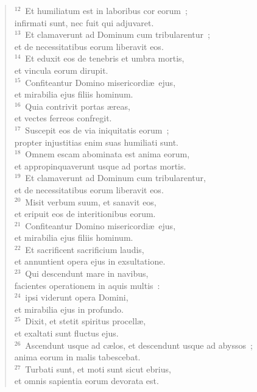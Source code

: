 \begin{verse}
${}^{12}$~Et humiliatum est in laboribus cor eorum~;\\ infirmati sunt, nec fuit qui adjuvaret.\\
${}^{13}$~Et clamaverunt ad Dominum cum tribularentur~;\\ et de necessitatibus eorum liberavit eos.\\
${}^{14}$~Et eduxit eos de tenebris et umbra mortis,\\ et vincula eorum dirupit.\\
${}^{15}$~Confiteantur Domino misericordi\ae\ ejus,\\ et mirabilia ejus filiis hominum.\\
${}^{16}$~Quia contrivit portas \ae reas,\\ et vectes ferreos confregit.\\
${}^{17}$~Suscepit eos de via iniquitatis eorum~;\\ propter injustitias enim suas humiliati sunt.\\
${}^{18}$~Omnem escam abominata est anima eorum,\\ et appropinquaverunt usque ad portas mortis.\\
${}^{19}$~Et clamaverunt ad Dominum cum tribularentur,\\ et de necessitatibus eorum liberavit eos.\\
${}^{20}$~Misit verbum suum, et sanavit eos,\\ et eripuit eos de interitionibus eorum.\\
${}^{21}$~Confiteantur Domino misericordi\ae\ ejus,\\ et mirabilia ejus filiis hominum.\\
${}^{22}$~Et sacrificent sacrificium laudis,\\ et annuntient opera ejus in exsultatione.\\
${}^{23}$~Qui descendunt mare in navibus,\\ facientes operationem in aquis multis~:\\
${}^{24}$~ipsi viderunt opera Domini,\\ et mirabilia ejus in profundo.\\
${}^{25}$~Dixit, et stetit spiritus procell\ae ,\\ et exaltati sunt fluctus ejus.\\
${}^{26}$~Ascendunt usque ad c\ae los, et descendunt usque ad abyssos~;\\ anima eorum in malis tabescebat.\\
${}^{27}$~Turbati sunt, et moti sunt sicut ebrius,\\ et omnis sapientia eorum devorata est.\\

\end{verse}
